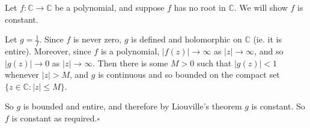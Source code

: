 \documentclass[12pt]{article}
\begin{document}
Let $f \colon \mathbb{C}\rightarrow\mathbb{C}$ be a polynomial, and suppose $f$ has no root in $\mathbb{C}$.  We will show $f$ is constant.

Let $g=\frac{1}{f}$.  Since $f$ is never zero, $g$ is defined and holomorphic on $\mathbb{C}$ (ie. it is entire).  Moreover, since $f$ is a polynomial, $|f(z)|\rightarrow\infty$ as $|z|\rightarrow\infty$, and so $|g(z)|\rightarrow 0$ as $|z|\rightarrow\infty$.  Then there is some $M>0$ such that $|g(z)|<1$ whenever $|z|>M$, and $g$ is continuous and so bounded on the compact set $\{ z\in\mathbb{C}:|z|\leq M\}$.

So $g$ is bounded and entire, and therefore by Liouville's theorem $g$ is constant.  So $f$ is constant as required.$\square$
\end{document}
